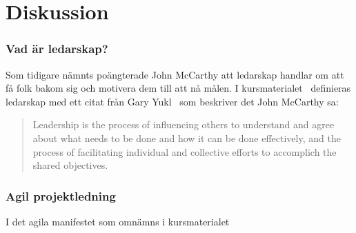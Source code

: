 \section{Diskussion}

\subsubsection{Vad är ledarskap?}
Som tidigare nämnts poängterade John McCarthy att ledarskap handlar om att få folk bakom sig och motivera dem till att nå målen. I kursmaterialet~\citep{leadership} definieras ledarskap med ett citat från Gary Yukl~\citep{yukl} som beskriver det John McCarthy sa:
\begin{quote}
Leadership is the process of influencing others to understand 
and agree about what needs to be done and how it can be 
done effectively, and the process of facilitating individual and 
collective efforts to accomplich the shared objectives.
\end{quote}

\subsubsection{Agil projektledning}
I det agila manifestet som omnämns i kursmaterialet~\citep{projekt}